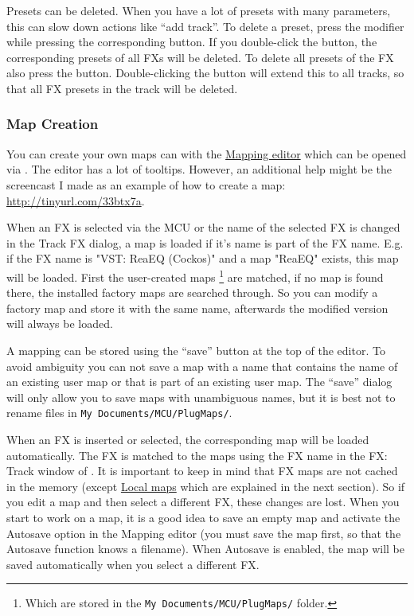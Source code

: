 Presets can be deleted. When you have a lot of presets with many
parameters, this can slow down actions like ``add track''. To delete a
preset, press the \option modifier while pressing the corresponding
\rec button. If you double-click the \rec button, the corresponding
presets of all FXs will be deleted. To delete all presets of the FX
also press the \alt button. Double-clicking the \rec button will
extend this to all tracks, so that all FX presets in the track will be
deleted.

\subsubsection{Map Creation}\label{createmaps}

You can create your own maps can with the
\hyperref[F:Screenshot_Plug_Mode]{Mapping editor} which can be opened
via \alt \plug. The editor has a lot of tooltips. However, an
additional help might be the screencast I made as an example of how to
create a map: \url{http://tinyurl.com/33btx7a}.

\newpage

When an FX is selected via the MCU or the name of the selected FX is
changed in the Track FX dialog, a map is loaded if it's name is part
of the FX name. E.g.  if the FX name is "VST: ReaEQ (Cockos)" and a
map "ReaEQ" exists, this map will be loaded. First the user-created
maps \footnote{Which are stored in the {\tt My
    Documents/MCU/PlugMaps/} folder.} are matched, if no map is found
there, the installed factory maps are searched through. So you can
modify a factory map and store it with the same name, afterwards the
modified version will always be loaded.

A mapping can be stored using the ``save'' button at the top of the editor. To
avoid ambiguity you can not  save a map with a name that contains the
name of an  existing user map or that is part of an existing user map.
The ``save'' dialog will only allow you to save maps with
unambiguous names, but it is best not to rename files in {\tt My
Documents/MCU/PlugMaps/}.

When an FX is inserted or selected, the corresponding map will be
loaded automatically. The FX is matched to the maps using the FX name
in the FX: Track window of \reaper. It is important to keep in mind
that FX maps are not cached in the memory (except
\hyperref[localmaps]{Local maps} which are explained in the next
section). So if you edit a map and then select a different FX, these
changes are lost. When you start to work on a map, it is a good idea
to save an empty map and activate the Autosave option in the Mapping
editor (you must save the map first, so that the Autosave function
knows a filename). When Autosave is enabled, the map will be saved
automatically when you select a different FX.

